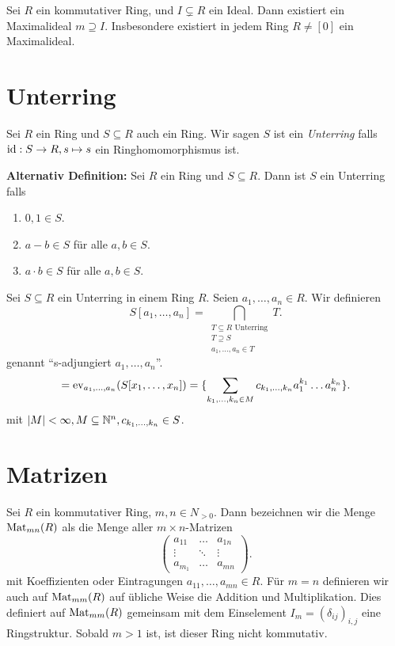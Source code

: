 \begin{theorem}
	Sei $R$ ein kommutativer Ring, und $I \subsetneq R$ ein Ideal. Dann existiert ein Maximalideal $m \supseteq I$.
	Insbesondere existiert in jedem Ring $R \neq [0]$ ein Maximalideal.
\end{theorem}


\section{Unterring}
\begin{definition}
	Sei $R$ ein Ring und $S \subseteq R$ auch ein Ring. Wir sagen $S$ ist ein \emph{Unterring} falls $\operatorname{id}: S \to R, s \mapsto s$ 
	ein Ringhomomorphismus ist.
	
	\textbf{Alternativ Definition:}
	Sei $R$ ein Ring und $S \subseteq R$. Dann ist $S$ ein Unterring falls
	\begin{enumerate}
		\item $0,1 \in S$.
		\item $a-b \in S$ für alle $a,b \in S$.
		\item $a\cdot b \in S$ für alle $a,b \in S$.
	\end{enumerate}
\end{definition}

\begin{notation}
	Sei $S \subseteq R$ ein Unterring in einem Ring $R$.
	Seien $a_1,\ldots,a_{n} \in R$. Wir definieren
	\[
		S[a_1,\ldots,a_{n}] = \bigcap_{\substack{T \subseteq R \text{ Unterring}\\ T \supseteq S\\ a_1,\ldots,a_{n} \in T}} T 
	.\] 
	genannt \enquote{s-adjungiert $a_1,\ldots,a_{n}$}.
	\[
	= \operatorname{ev}_{a_1,\ldots,a_{n}}(S[x_1,\ldots,x_{n}]) = \{\sum_{k_1,\ldots,k_{n} \in M} c_{k_1,\ldots,k_{n}} a_1^{k_1} \ldots a_{n}^{k_{n}} \} 
	.\] 
	mit $\abs{M} < \infty, M \subseteq \mathbb{N}^{n}, c_{k_1,\ldots,k_{n}} \in S$.
\end{notation}




\section{Matrizen}
Sei $R$ ein kommutativer Ring, $m,n \in N_{> 0}$.
Dann bezeichnen wir die Menge $\operatorname{Mat}_{mn}(R)$ als die Menge aller $m \times n$-Matrizen
\[
\begin{pmatrix} 
a_{11} &\ldots &a_{1n}\\
\vdots &\ddots &\vdots\\
a_{m_1} &\ldots &a_{mn}
\end{pmatrix} 
.\] 
mit Koeffizienten oder Eintragungen $a_{11},\ldots,a_{mn} \in R$.
Für $m=n$ definieren wir auch auf $\operatorname{Mat}_{mm}(R)$ auf übliche Weise die Addition und Multiplikation.
Dies definiert auf $\operatorname{Mat}_{mm}(R)$ gemeinsam mit dem Einselement $I_{m} = (\delta_{ij})_{i,j}$ eine Ringstruktur.
Sobald $m > 1$ ist, ist dieser Ring nicht kommutativ.


